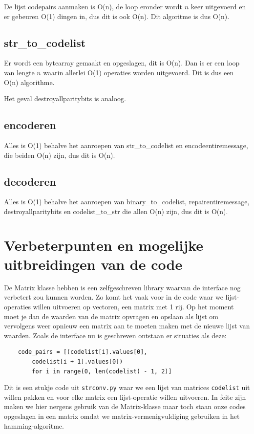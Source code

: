 \documentclass[a4paper]{article}
\begin{document}
De lijst codepairs aanmaken is O(n), de loop eronder wordt $n$ keer uitgevoerd en er gebeuren O(1) dingen in, dus dit is ook O(n). Dit algoritme is dus O(n).

\subsection{str\_to\_codelist}

Er wordt een bytearray gemaakt en opgeslagen, dit is O(n). Dan is er een loop van lengte $n$ waarin allerlei O(1) operaties worden uitgevoerd. Dit is dus een O(n) algorithme. 


Het geval destroyallparitybits is analoog.

\subsection{encoderen}

Alles is O(1) behalve het aanroepen van str\_to\_codelist en encodeentiremessage, die beiden O(n) zijn, dus dit is O(n).

\subsection{decoderen}

Alles is O(1) behalve het aanroepen van binary\_to\_codelist, repairentiremessage, destroyallparitybits en codelist\_to\_str die allen O(n) zijn, dus dit is O(n).




\section{Verbeterpunten en mogelijke uitbreidingen van de code}
De Matrix klasse hebben is een zelfgeschreven library waarvan de interface nog verbetert zou kunnen worden. Zo komt het vaak voor in de code waar we lijst-operaties willen uitvoeren op vectoren, een matrix met 1 rij. Op het moment moet je dan de waarden van de matrix opvragen en opslaan als lijst om vervolgens weer opnieuw een matrix aan te moeten maken met de nieuwe lijst van waarden. Zoals de interface nu is geschreven ontstaan er situaties als deze:
\begin{lstlisting}
	code_pairs = [(codelist[i].values[0], 
		codelist[i + 1].values[0]) 
		for i in range(0, len(codelist) - 1, 2)]
\end{lstlisting}
Dit is een stukje code uit \texttt{strconv.py} waar we een lijst van matrices \texttt{codelist} uit willen pakken en voor elke matrix een lijst-operatie willen uitvoeren. In feite zijn maken we hier nergens gebruik van de Matrix-klasse maar toch staan onze codes opgeslagen in een matrix omdat we matrix-vermenigvuldiging gebruiken in het hamming-algoritme.
\end{document}

